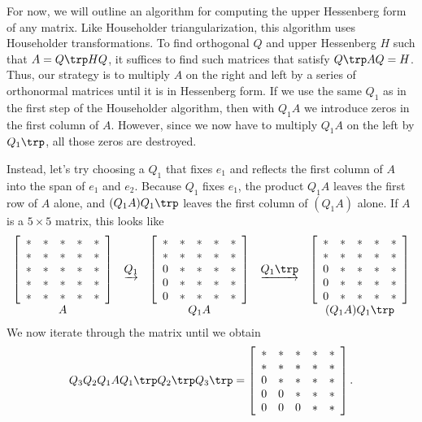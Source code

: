 
For now, we will outline an algorithm for computing the upper Hessenberg form of any matrix.
Like Householder triangularization, this algorithm uses Householder transformations.
To find orthogonal $Q$ and upper Hessenberg $H$ such that $A = Q\trp HQ$, it suffices to find such matrices that satisfy $Q\trp AQ=H$.
Thus, our strategy is to multiply $A$ on the right and left by a series of orthonormal matrices until it is in Hessenberg form.
If we use the same $Q_1$ as in the first step of the Householder algorithm, then with $Q_1 A$ we introduce zeros in the first column of $A$.
However, since we now have to multiply $Q_1 A$ on the left by $Q_1\trp$, all those zeros are destroyed.

Instead, let's try choosing a $Q_1$ that fixes $e_1$ and reflects the first column of $A$ into the span of $e_1$ and $e_2$.
Because $Q_1$ fixes $e_1$, the product $Q_1A$ leaves the first row of $A$ alone, and $(Q_1A)Q_1\trp$ leaves the first column of $(Q_1A)$ alone.
If $A$ is a $5 \times 5$ matrix, this looks like
\[
\begin{array}{ccccc}
\left[\begin{array}{ccccc}
* & * & * & * & * \\
* & * & * & * & * \\
* & * & * & * & * \\
* & * & * & * & * \\
* & * & * & * & *
\end{array}\right]
&\underrightarrow{Q_1}&
\left[\begin{array}{ccccc}
* & * & * & * & * \\
* & * & * & * & * \\
0 & * & * & * & * \\
0 & * & * & * & * \\
0 & * & * & * & *
\end{array}\right]
&\underrightarrow{Q_1\trp }&
\left[\begin{array}{ccccc}
* & * & * & * & * \\
* & * & * & * & * \\
0 & * & * & * & * \\
0 & * & * & * & * \\
0 & * & * & * & *
\end{array}\right]
\\
A & & Q_1A & & (Q_1 A) Q_1\trp
\end{array}
\]
We now iterate through the matrix until we obtain
\begin{equation*}
Q_3 Q_2 Q_1 A Q_1\trp Q_2 \trp Q_3\trp =
\left[\begin{array}{ccccc}
* & * & * & * & * \\
* & * & * & * & * \\
0 & * & * & * & * \\
0 & 0 & * & * & * \\
0 & 0 & 0 & * & *
\end{array}\right].
\end{equation*}

